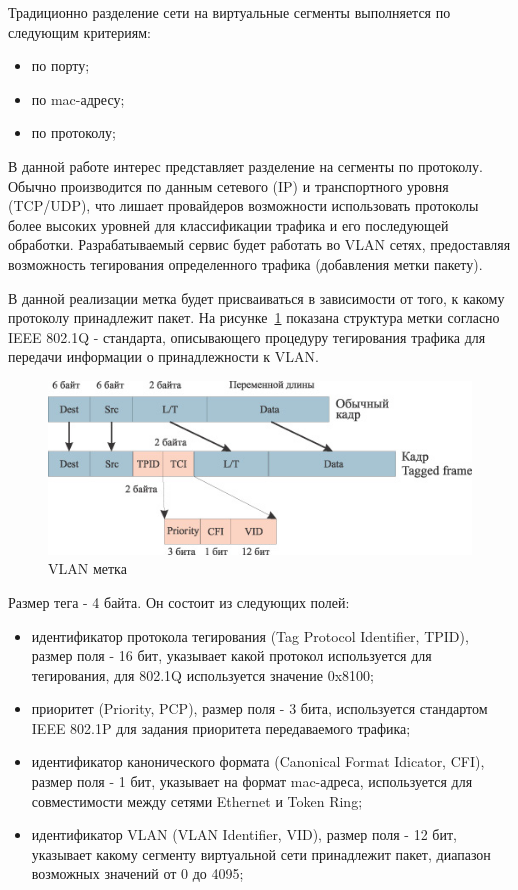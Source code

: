 Традиционно разделение сети на виртуальные сегменты выполняется по следующим критериям:
\begin{itemize}
\item по порту;
\item по mac-адресу;
\item по протоколу;
\end{itemize}

В данной работе интерес представляет разделение на сегменты по протоколу. Обычно производится по данным сетевого (IP) и транспортного уровня (TCP/UDP), что лишает провайдеров возможности использовать протоколы более высоких уровней для классификации трафика и его последующей обработки. Разрабатываемый сервис будет работать во VLAN сетях, предоставляя возможность тегирования определенного трафика (добавления метки пакету).

В данной реализации метка будет присваиваться в зависимости от того, к какому протоколу принадлежит пакет. На рисунке~\ref{pic:vlan_tag} показана структура метки согласно IEEE 802.1Q - стандарта, описывающего процедуру тегирования трафика для передачи информации о принадлежности к VLAN.
\begin{figure}
\centering
\includegraphics[scale=0.55]{pictures/vlan_tag}
\caption{VLAN метка}
\label{pic:vlan_tag}
\end{figure}

Размер тега - 4 байта. Он состоит из следующих полей:
\begin{itemize}
\item идентификатор протокола тегирования (Tag Protocol Identifier, TPID), размер поля - 16 бит, указывает какой протокол используется для тегирования, для 802.1Q используется значение 0x8100;
\item приоритет (Priority, PCP), размер поля - 3 бита, используется стандартом IEEE 802.1P для задания приоритета передаваемого трафика;
\item идентификатор канонического формата (Canonical Format Idicator, CFI), размер поля - 1 бит, указывает на формат mac-адреса, используется для совместимости между сетями Ethernet и Token Ring;
\item идентификатор VLAN (VLAN Identifier, VID), размер поля - 12 бит, указывает какому сегменту виртуальной сети принадлежит пакет, диапазон возможных значений от 0 до 4095;
\end{itemize}

